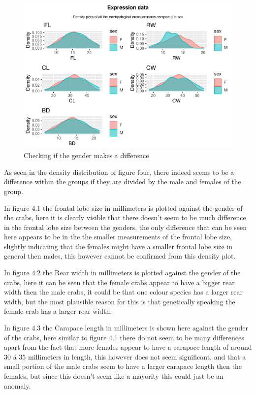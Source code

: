 \documentclass[
]{article}
\begin{document}
\newpage
\begin{figure}[H]

{\centering \includegraphics{CrabProject_files/figure-latex/figure4-1} 

}

\caption{Checking if the gender makes a difference}\label{fig:figure4}
\end{figure}

As seen in the density distribution of figure four, there indeed seems
to be a difference within the groups if they are divided by the male and
females of the group.

In figure 4.1 the frontal lobe size in millimeters is plotted against
the gender of the crabs, here it is clearly visible that there doesn't
seem to be much difference in the frontal lobe size between the genders,
the only difference that can be seen here appears to be in the the
smaller measurements of the frontal lobe size, slightly indicating that
the females might have a smaller frontal lobe size in general then
males, this however cannot be confirmed from this density plot.

In figure 4.2 the Rear width in millimeters is plotted against the
gender of the crabs, here it can be seen that the female crabs appear to
have a bigger rear width then the male crabs, it could be that one
colour species has a larger rear width, but the most plausible reason
for this is that genetically speaking the female crab has a larger rear
width.

In figure 4.3 the Carapace length in millimeters is shown here against
the gender of the crabs, here similar to figure 4.1 there do not seem to
be many differences apart from the fact that more females appear to have
a carapace length of around 30 á 35 millimeters in length, this however
does not seem significant, and that a small portion of the male crabs
seem to have a larger carapace length then the females, but since this
doesn't seem like a mayority this could just be an anomaly.
\end{document}
